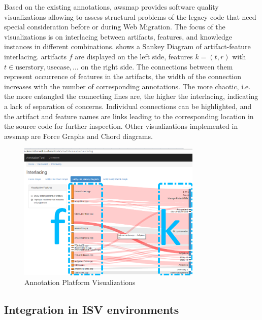 Based on the existing annotations, \gls{awsmap} provides software quality visualizations allowing to assess structural problems of the legacy code that need special consideration before or during \gls{Web Migration}.
The focus of the visualizations is on interlacing between \glspl{artifact}, features, and knowledge instances in different combinations.
 shows a Sankey Diagram of \gls{artifact}-feature interlacing.
\glspl{artifact} \(f\) are displayed on the left side, features \(k=(t,r)\) with \(t \in {\mathrm{user story}, \mathrm{use case}, \ldots}\) on the right side.
The connections between them represent occurrence of features in the artifacts, the width of the connection increases with the number of corresponding annotations.
The more chaotic, i.e. the more entangled the connecting lines are, the higher the interlacing, indicating a lack of separation of concerns.
Individual connections can be highlighted, and the \gls{artifact} and feature names are links leading to the corresponding location in the source code for further inspection.
Other visualizations implemented in \gls{awsmap} are Force Graphs and Chord diagrams.
\begin{figure}[h!]
\hypertarget{fig:awsmap.sankey}{%
\centering
\includegraphics[width=0.78\textwidth]{../figures/screenshots/sankey2.png}
\caption{Annotation Platform Visualizations}\label{fig:awsmap.sankey}
}
\end{figure}

\vspace{-10pt}
\hypertarget{sec:re.impl.integration}{%
\subsection{Integration in ISV environments}\label{sec:re.impl.integration}}
\vspace{10pt}

